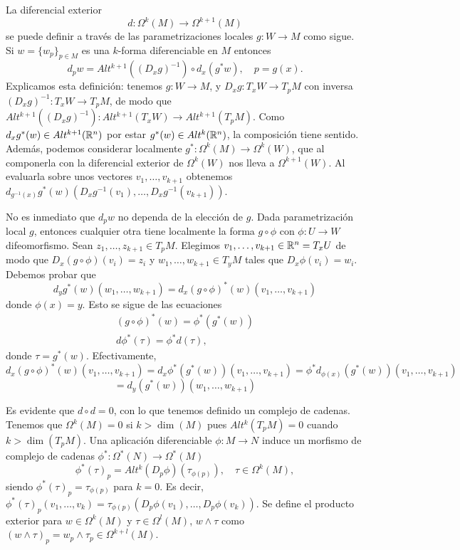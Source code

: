 \documentclass[CV.tex]{subfiles}
\begin{document}
La diferencial exterior
\[
d:\Omega^k(M)\to\Omega^{k+1}(M)
\]
se puede definir a través de las parametrizaciones locales $g:W\to M$ como sigue. Si $w=\{w_p\}_{p\in M}$ es una $k$-forma diferenciable en $M$ entonces
\[
d_pw=Alt^{k+1}((D_xg)^{-1})\circ d_x(g^*w),\quad p=g(x).
\]
Explicamos esta definición: tenemos $g:W\to M$, y $D_xg:T_xW\to T_pM$ con inversa $(D_xg)^{-1}:T_xW\to T_pM$, de modo que $Alt^{k+1}((D_xg)^{-1}):Alt^{k+1}(T_xW)\to Alt^{k+1}(T_pM)$. Como $d_xg^*(w)\in Alt^{k+1}(\mathbb{R}^n)$ por estar $g^*(w)\in Alt^{k}(\mathbb{R}^n)$, la composición tiene sentido. Además, podemos considerar localmente $g^*:\Omega^k(M)\to \Omega^k(W)$, que al componerla con la diferencial exterior de $\Omega^k(W)$ nos lleva a $\Omega^{k+1}(W)$. Al evaluarla sobre unos vectores $v_1,\dots, v_{k+1}$ obtenemos $d_{g^{-1}(x)}g^*(w)(D_xg^{-1}(v_1),\dots, D_xg^{-1}(v_{k+1}))$. 

No es inmediato que $d_pw$ no dependa de la elección de $g$. Dada parametrización local $g$, entonces cualquier otra tiene localmente la forma $g\circ\phi$ con $\phi:U\to W$ difeomorfismo. Sean $z_1,\dots, z_{k+1}\in T_pM$. Elegimos $v_1,\dots, v_{k+1}\in\mathbb{R}^n=T_xU$ de modo que $D_x(g\circ \phi)(v_i)=z_i$ y $w_1,\dots, w_{k+1}\in T_yM$ tales que $D_x\phi(v_i)=w_i$. Debemos probar que
\[
d_yg^*(w)(w_1,\dots, w_{k+1})=d_x(g\circ\phi)^*(w)(v_1,\dots,v_{k+1})
\]
donde $\phi(x)=y$. Esto se sigue de las ecuaciones 
\begin{gather*}
(g\circ\phi)^*(w)=\phi^*(g^*(w))\\
d\phi^*(\tau)=\phi^*d(\tau),
\end{gather*}
donde $\tau=g^*(w)$. %
Efectivamente,
\[
d_x(g\circ\phi)^*(w)(v_1,\dots,v_{k+1})=d_x\phi^*( g^*(w))(v_1,\dots,v_{k+1})=\phi^*d_{\phi(x)}(g^*(w))(v_1,\dots,v_{k+1})
\] 
\[
=d_y(g^*(w))(w_1,\dots, w_{k+1})
\]

Es evidente que $d\circ d=0$, con lo que tenemos definido un complejo de cadenas. Tenemos que $\Omega^k(M)=0$ si $k>\dim(M)$ pues $Alt^k(T_pM)=0$ cuando $k>\dim(T_pM)$. Una aplicación diferenciable $\phi:M\to N$ induce un morfismo de complejo de cadenas $\phi^*:\Omega^*(N)\to\Omega^*(M)$
\[
\phi^*(\tau)_p=Alt^k(D_p\phi)(\tau_{\phi(p)}),\quad \tau\in \Omega^k(M),
\]
siendo $\phi^*(\tau)_p=\tau_{\phi(p)}$ para $k=0$. Es decir, $\phi^*(\tau)_p(v_1,\dots, v_k)=\tau_{\phi(p)}(D_p\phi(v_1),\dots, D_p\phi(v_k))$. Se define el producto exterior para $w\in\Omega^k(M)$ y $\tau\in\Omega^l(M)$, $w\land\tau$ como $(w\land\tau)_p=w_p\land\tau_p\in\Omega^{k+l}(M)$.
\end{document}
